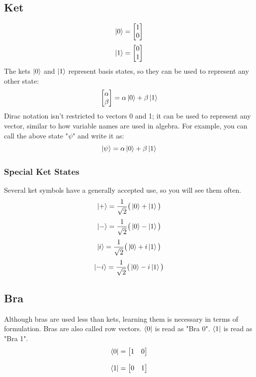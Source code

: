 \documentclass{article}
\begin{document}
\subsection{Ket}
\begin{equation*}
    \ket{0} = \begin{bmatrix} 1 \\ 0 \end{bmatrix} 
\end{equation*}
\begin{equation*}
    \ket{1} = \begin{bmatrix} 0 \\ 1 \end{bmatrix}
\end{equation*}
The kets $\ket{0}$ and $\ket{1}$ represent basis states, so they can be used to represent any other state:
\begin{equation*}
    \begin{bmatrix} \alpha \\ \beta \end{bmatrix} = \alpha\ket{0} + \beta\ket{1}
\end{equation*}
Dirac notation isn't restricted to vectors 0 and 1; it can be used to represent any vector, similar to how variable names are used in algebra. For example, you can call the above state "$\psi$" and write it as:
\begin{equation*}
    \ket{\psi} = \alpha\ket{0} + \beta\ket{1}
\end{equation*}
\subsubsection{Special Ket States}
Several ket symbols have a generally accepted use, so you will see them often.
$$\ket{+} = \frac{1}{\sqrt{2}}\big(\ket{0} + \ket{1}\big)$$
$$\ket{-} = \frac{1}{\sqrt{2}}\big(\ket{0} - \ket{1}\big)$$
$$\ket{i} = \frac{1}{\sqrt{2}}\big(\ket{0} + i\ket{1}\big)$$
$$\ket{-i} = \frac{1}{\sqrt{2}}\big(\ket{0} - i\ket{1}\big)$$
\subsection{Bra}
Although bras are used less than kets, learning them is necessary in terms of formulation. Bras are also called row vectors.
$\bra{0}$ is read as "Bra 0". $\bra{1}$ is read as "Bra 1".
\[
\bra{0} = \begin{bmatrix} 1 & 0 \end{bmatrix}
\]

\[
\bra{1} = \begin{bmatrix} 0 & 1 \end{bmatrix}
\]
\end{document}
